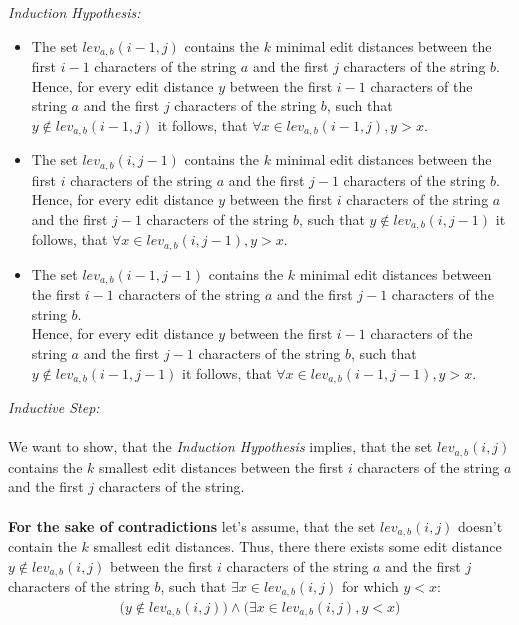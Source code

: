 \documentclass[fleqn,leqno]{article}
\begin{document}
\textit{Induction Hypothesis:}
\begin{itemize}
	\item The set $lev_{a,b}(i - 1, j)$ contains the $k$ minimal edit distances between the first $i - 1$ characters of the string $a$ and the first $j$ characters of the string $b$. \\
		Hence, for every edit distance $y$ between the first $i - 1$ characters of the string $a$ and the first $j$ characters of the string $b$, such that $y \not \in lev_{a,b}(i - 1, j)$ it follows, that $\forall x \in lev_{a,b}(i - 1, j), y > x$.
	\item The set $lev_{a,b}(i, j - 1)$ contains the $k$ minimal edit distances between the first $i$ characters of the string $a$ and the first $j - 1$ characters of the string $b$. \\
		Hence, for every edit distance $y$ between the first $i$ characters of the string $a$ and the first $j - 1$ characters of the string $b$, such that $y \not \in lev_{a,b}(i, j - 1)$ it follows, that $\forall x \in lev_{a,b}(i, j - 1), y > x$.
	\item The set $lev_{a,b}(i - 1, j - 1)$ contains the $k$ minimal edit distances between the first $i - 1$ characters of the string $a$ and the first $j - 1$ characters of the string $b$. \\
		Hence, for every edit distance $y$ between the first $i - 1$ characters of the string $a$ and the first $j - 1$ characters of the string $b$, such that $y \not \in lev_{a,b}(i - 1, j - 1)$ it follows, that $\forall x \in lev_{a,b}(i - 1, j - 1), y > x$.
\end{itemize}

\textit{Inductive Step:} \\ \\
We want to show, that the \textit{Induction Hypothesis} implies, that the set $lev_{a,b}(i, j)$ contains the $k$ smallest edit distances between the first $i$ characters of the string $a$ and the first $j$ characters of the string. \\ \\
\textbf{For the sake of contradictions} let's assume, that the set $lev_{a,b}(i, j)$ doesn't contain the $k$ smallest edit distances. Thus, there there exists some edit distance $y \not \in lev_{a,b}(i, j)$ between the first $i$ characters of the string $a$ and the first $j$ characters of the string $b$, such that $\exists x \in lev_{a,b}(i, j)$ for which $y < x$:
\begin{equation}
\begin{split}
	\Big( y \not \in lev_{a,b}(i, j) \Big) \land \Big( \exists x \in lev_{a,b}(i, j), y < x \Big)
\end{split}
\end{equation}
\end{document}
